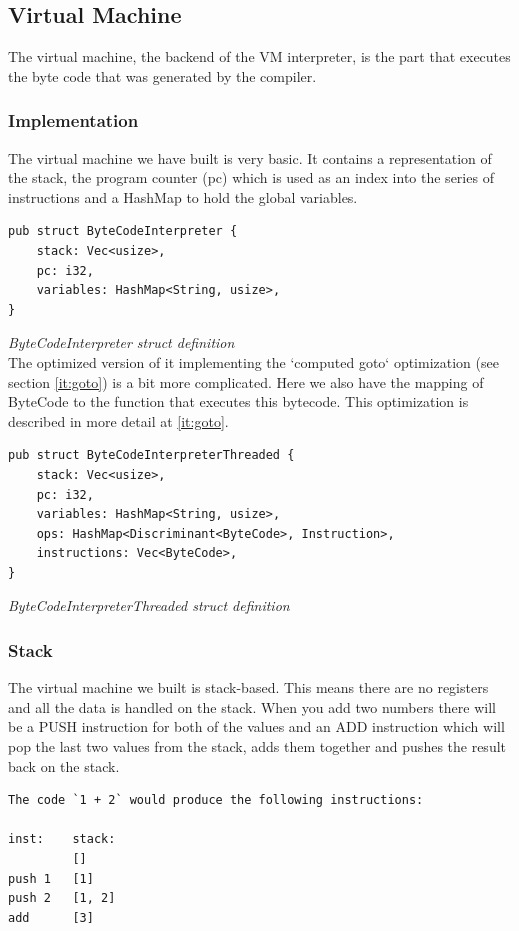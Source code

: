 \documentclass{article}
\begin{document}
\subsection{Virtual Machine}
The virtual machine, the backend of the VM interpreter, is the part that
executes the byte code that was generated by the compiler.

\subsubsection{Implementation}
The virtual machine we have built is very basic. It contains a representation
of the stack, the program counter (pc) which is used as an index into the
series of instructions and a HashMap to hold the global variables.

\begin{verbatim}
pub struct ByteCodeInterpreter {
    stack: Vec<usize>,
    pc: i32,
    variables: HashMap<String, usize>,
}
\end{verbatim}
\textit{ByteCodeInterpreter struct definition} \\

The optimized version of it implementing the `computed goto` optimization (see
section \ref{it:goto}) is a bit more complicated. Here we also have the mapping
of ByteCode to the function that executes this bytecode. This optimization is 
described in more detail at \ref{it:goto}.

\begin{verbatim}
pub struct ByteCodeInterpreterThreaded {
    stack: Vec<usize>,
    pc: i32,
    variables: HashMap<String, usize>,
    ops: HashMap<Discriminant<ByteCode>, Instruction>,
    instructions: Vec<ByteCode>,
}
\end{verbatim}
\textit{ByteCodeInterpreterThreaded struct definition} \\

\subsubsection{Stack}
The virtual machine we built is stack-based. This means there are no registers
and all the data is handled on the stack. When you add two numbers there will
be a PUSH instruction for both of the values and an ADD instruction which will
pop the last two values from the stack, adds them together and pushes the
result back on the stack.

\begin{verbatim}
The code `1 + 2` would produce the following instructions:

inst:    stack:
         []
push 1   [1]
push 2   [1, 2]
add      [3]
\end{verbatim}
\end{document}

